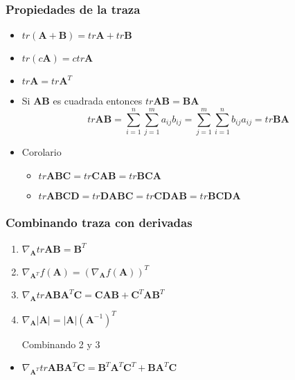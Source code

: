 \documentclass{beamer}
\begin{document}
\begin{frame}
\frametitle{Propiedades de la traza}

\begin{itemize}
\item $tr (\boldsymbol{A}+\boldsymbol{B})= tr \boldsymbol{A}+tr\boldsymbol{B}$  
\item $tr (c\boldsymbol{A})= c tr \boldsymbol{A}$
\item $tr \boldsymbol{A}= tr \boldsymbol{A}^T$
\item Si $\boldsymbol{AB}$ es cuadrada entonces $tr \boldsymbol{AB} = \boldsymbol{BA}$ 
\begin{equation*}
tr \boldsymbol{AB}= \sum_{i=1}^{n}\sum_{j=1}^{m} a_{ij}b_{ij}= \sum_{j=1}^{m}\sum_{i=1}^{n} b_{ij}a_{ij} = tr \boldsymbol{BA}
\end{equation*}

\item Corolario
\begin{itemize}
\item $tr \boldsymbol{ABC}=tr \boldsymbol{CAB}= tr \boldsymbol{BCA}$
\item $tr \boldsymbol{ABCD}=tr \boldsymbol{DABC}=tr \boldsymbol{CDAB}=tr \boldsymbol{BCDA}$
\end{itemize}
\end{itemize}
\end{frame}
\begin{frame}
\frametitle{Combinando traza con derivadas}

\begin{enumerate}


\item $ \nabla_{\boldsymbol{A}}tr\boldsymbol{AB}=\boldsymbol{B}^T $
\item $ \nabla_{\boldsymbol{A}^T}f(\boldsymbol{A})= (\nabla_{\boldsymbol{A}}f(\boldsymbol{A}))^T $
\item $\nabla_{\boldsymbol{A}} tr \boldsymbol{ABA}^T\boldsymbol{C}= \boldsymbol{CAB}+ \boldsymbol{C}^T \boldsymbol{AB}^T$
\item $\nabla_{\boldsymbol{A}} \vert \boldsymbol{A}\vert=\vert \boldsymbol{A}\vert(\boldsymbol{A}^{-1})^T$ 

\vspace{2em}
Combinando 2 y 3 


\end{enumerate}
\begin{itemize}
\item $ \nabla_{\boldsymbol{A}^T}tr \boldsymbol{ABA}^T \boldsymbol{C}= \boldsymbol{B}^T\boldsymbol{A}^T\boldsymbol{C}^T+\boldsymbol{B}\boldsymbol{A}^T\boldsymbol{C}$
\end{itemize}


\end{frame}
\end{document}
